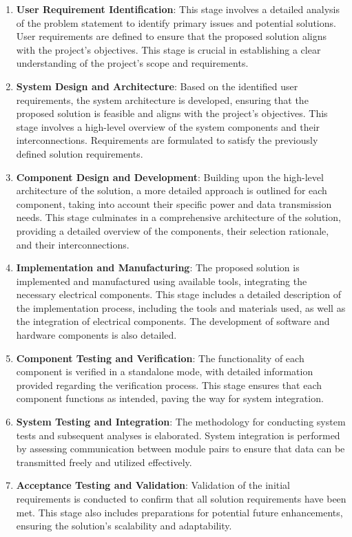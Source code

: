 \begin{enumerate}
  \item \textbf{User Requirement Identification}: This stage involves a detailed analysis of the problem statement to identify primary issues and potential solutions. User requirements are defined to ensure that the proposed solution aligns with the project's objectives. This stage is crucial in establishing a clear understanding of the project's scope and requirements.

  \item \textbf{System Design and Architecture}: Based on the identified user requirements, the system architecture is developed, ensuring that the proposed solution is feasible and aligns with the project's objectives. This stage involves a high-level overview of the system components and their interconnections. Requirements are formulated to satisfy the previously defined solution requirements.

  \item \textbf{Component Design and Development}: Building upon the high-level architecture of the solution, a more detailed approach is outlined for each component, taking into account their specific power and data transmission needs. This stage culminates in a comprehensive architecture of the solution, providing a detailed overview of the components, their selection rationale, and their interconnections.

  \item \textbf{Implementation and Manufacturing}: The proposed solution is implemented and manufactured using available tools, integrating the necessary electrical components. This stage includes a detailed description of the implementation process, including the tools and materials used, as well as the integration of electrical components. The development of software and hardware components is also detailed.

  \item \textbf{Component Testing and Verification}: The functionality of each component is verified in a standalone mode, with detailed information provided regarding the verification process. This stage ensures that each component functions as intended, paving the way for system integration.

  \item \textbf{System Testing and Integration}: The methodology for conducting system tests and subsequent analyses is elaborated. System integration is performed by assessing communication between module pairs to ensure that data can be transmitted freely and utilized effectively.

  \item \textbf{Acceptance Testing and Validation}: Validation of the initial requirements is conducted to confirm that all solution requirements have been met. This stage also includes preparations for potential future enhancements, ensuring the solution's scalability and adaptability.
\end{enumerate}

